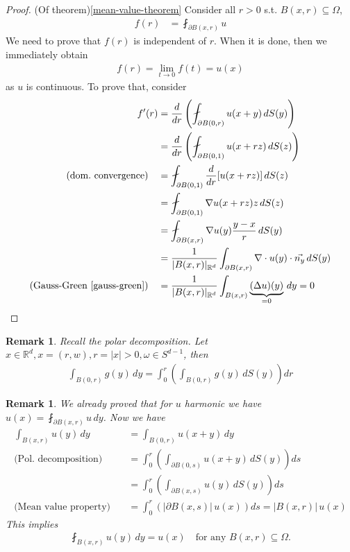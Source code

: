 \documentclass{report}
\theoremstyle{tommy}
\newtheorem{rem}[defn]{Remark}
\begin{document}
\begin{proof} (Of theorem)\ref{mean-value-theorem}
  Consider all \(r > 0\) s.t. \(B(x,r) \subseteq \Omega\),
  \begin{align*}
    f(r) &= \fint_{\partial B(x,r)} u
  \end{align*}
  We need to prove that \(f(r)\) is independent of \(r\). When it is done, then we immediately obtain
  \begin{align*}
    f(r) = \lim_{t \to 0} f(t) = u(x)
  \end{align*}
  as \(u\) is continuous. To prove that, consider
  \begin{align*}
    f'(r) 
    &= \frac{d}{dr} \left(\fint_{\partial B(0, r)} u(x+y) \, dS(y) \right) \\
    &= \frac{d}{dr} \left(\fint_{\partial B(0, 1)} u(x + rz) \, dS(z) \right) \\
    \text{(dom.\ convergence)} \quad & = \fint_{\partial B(0, 1)} \frac{d}{dr} [u(x + rz)] \, dS(z) \\
    &= \fint_{\partial B(0, 1)} \nabla u(x + rz) z \, dS(z) \\
    &= \fint_{\partial B(x, r)} \nabla u(y) \frac{y-x}{r} \, dS(y) \\
    &= \frac{1}{|B(x, r)|_{\mathbb{R}^d}} \int_{\partial B(x, r)} \nabla \cdot u(y) \cdot \vec{n_y} \, dS(y) \\
    \text{(Gauss-Green \ref{gauss-green})} \quad &= \frac{1}{|B(x, r)|_{\mathbb{R}^d}} \int_{B(x, r)} \underbrace{(\Delta u)(y)}_{= 0} \, dy = 0 \qedhere
  \end{align*}
\end{proof}

\begin{rem}
  Recall the polar decomposition. Let \(x \in \mathbb{R}^d, x = (r,w), r = |x| > 0, \omega \in S^{d-1}\), then
  \begin{align*}
    \int_{B(0, r)} g(y) \, dy = \int_0^r \left(\int_{B(0, r)} g(y) \, dS(y) \right) dr
  \end{align*}
\end{rem}


\begin{rem}
  We already proved that for \(u\) harmonic we have \( u(x) = \fint_{\partial B(x,r)} u \, dy \). Now we have 
  \begin{align*}
    \int_{B(x, r)} u(y) \, dy 
    &= \int_{B(0, r)} u(x+y) \, dy \\
    \text{(Pol.\ decomposition)} \quad &= \int_0^r \left(\int_{\partial B(0, s)} u(x+y) \, dS(y)\right) ds \\
    &= \int_0^r \left(\int_{\partial B(x, s)} u(y) \, dS(y) \right) ds \\
    \text{(Mean value property)} \quad &= \int_0^r \left(|\partial B(x, s)| \, u(x) \right) ds
    = |B(x,r)| \, u(x)
  \end{align*}
  This implies
  \begin{align*}
    \fint_{B(x,r)} u(y) \, dy = u(x)
    \quad \text{for any \(B(x,r) \subseteq \Omega\).}
  \end{align*}
\end{rem}
\end{document}
